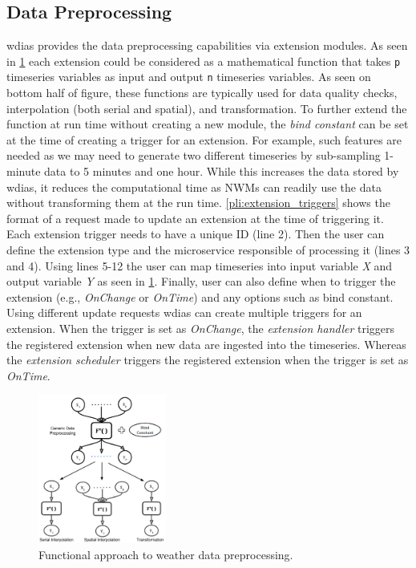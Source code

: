 \documentclass[conference]{IEEEtran}
\begin{document}
\subsection{Data Preprocessing}
\label{psubse:data_preprocessing}

\acrshort{wdias} provides the data preprocessing capabilities via extension modules. As seen in \cref{pfi:summary_weather_data_preprocessing} each extension could be considered as a mathematical function that takes \texttt{p} timeseries variables as input and output \texttt{n} timeseries variables. As seen on bottom half of figure, these functions are typically used for data quality checks, interpolation (both serial and spatial), and transformation. To further extend the function at run time without creating a new module, the \textit{bind constant} can be set at the time of creating a trigger for an extension. For example, such features are needed as we may need to generate two different timeseries by sub-sampling 1-minute data to 5 minutes and one hour. While this increases the data stored by \acrshort{wdias}, it reduces the computational time as NWMs can readily use the data without transforming them at the run time. \cref{pli:extension_triggers} shows the format of a request made to update an extension at the time of triggering it. Each extension trigger needs to have a unique ID (line 2). Then the user can define the extension type and the microservice responsible of processing it (lines 3 and 4). Using lines 5-12 the user can map timeseries into input variable \emph{X} and output variable \emph{Y} as seen in \cref{pfi:summary_weather_data_preprocessing}. Finally, user can also define when to trigger the extension (e.g., \textit{OnChange} or \textit{OnTime}) and any options such as bind constant. Using different update requests \acrshort{wdias} can create multiple triggers for an extension. When the trigger is set as \emph{OnChange}, the \emph{extension handler} triggers the registered extension when new data are ingested into the timeseries. Whereas the \emph{extension scheduler} triggers the registered extension when the trigger is set as \emph{OnTime}. 


\begin{figure}[!tb]
\centerline{\includegraphics[width=0.375\textwidth]{images/summary_weather_data_preprocessing_p1.pdf}}
\caption{Functional approach to weather data preprocessing.}
\label{pfi:summary_weather_data_preprocessing}
\end{figure}
\end{document}
